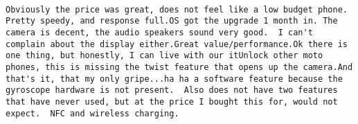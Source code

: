 \documentclass[
  11pt,
]{article}
\begin{document}
\begin{verbatim}
                                                                                                                                                                                                                                                                                                                                                                                                                                                                                                                                                                                                                                                 Obviously the price was great, does not feel like a low budget phone.  Pretty speedy, and response full.OS got the upgrade 1 month in. The camera is decent, the audio speakers sound very good.  I can't complain about the display either.Great value/performance.Ok there is one thing, but honestly, I can live with our itUnlock other moto phones, this is missing the twist feature that opens up the camera.And that's it, that my only gripe...ha ha a software feature because the gyroscope hardware is not present.  Also does not have two features that have never used, but at the price I bought this for, would not expect.  NFC and wireless charging.

\end{verbatim}
\end{document}
